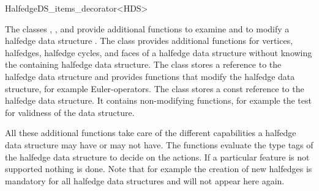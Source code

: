 
\ccRefPageBegin



\begin{ccRefClass}{HalfedgeDS_items_decorator<HDS>}

\ccDefinition

The classes ,
, and
 provide additional functions
to examine and to modify a halfedge data structure . The class
 provides additional functions
for vertices, halfedges, {\XHDS halfedge cycles}, and faces 
of a halfedge data structure
without knowing the containing halfedge data structure. The class
 stores a reference to the halfedge
data structure and provides functions that modify the halfedge data
structure, for example Euler-operators. The class
 stores a const reference to
the halfedge data structure. It contains non-modifying functions, for
example the test for validness of the data structure.

All these additional functions take care of the different capabilities
a halfedge data structure may have or may not have.  The functions
evaluate the type tags of the halfedge data structure to decide on the
actions. If a particular feature is not supported nothing is done.
Note that for example the creation of new halfedges is mandatory for
all halfedge data structures and will not appear here again.


\ccTypes

\ccThreeToTwo

\ccGlue
{}
\ccGlue
{}
\ccGlue
{}
\ccGlue
{}
\ccGlue
{}


\end{ccRefClass}
